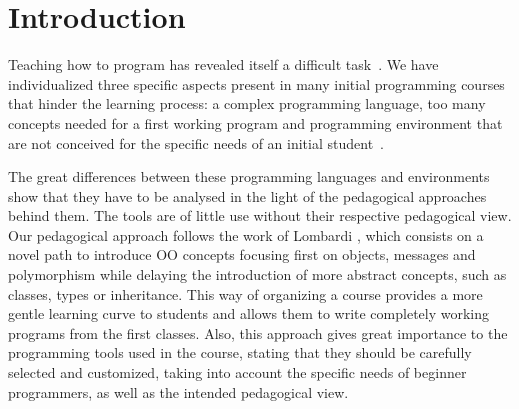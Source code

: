 \section{Introduction}
\label{sec:intro}



Teaching how to program has revealed itself a difficult task~\cite{dijkstra_89a, jenkins2002difficulty}.
We have individualized three specific aspects present in many initial programming courses that hinder  the learning process: 
a complex programming language,
too many concepts needed for a first working program and
programming environment that are not conceived for the specific needs of an initial student~\cite{singh2012}.



\medskip

The great differences between these programming languages and environments show that they have to be analysed in the light of the pedagogical approaches behind them.
The tools are of little use without their respective pedagogical view.
Our pedagogical approach follows the work of Lombardi \etal
\cite{lombardi_instances_2007,lombardi_carlos_alumnos_2008,griggio_programming_2011,spigariol_lucas_ensenando_2013,passerini2017wollok}, 
which consists on a novel path to introduce OO concepts focusing first on objects, messages and polymorphism 
while delaying the introduction of more abstract concepts,
such as classes, types or inheritance.
This way of organizing a course provides a more gentle learning curve to students and allows them to write completely working programs from the first classes.
Also, this approach gives great importance to the programming tools used in the course, 
stating that they should be carefully selected and customized, 
taking into account the specific needs of beginner programmers,
as well as the intended pedagogical view.

